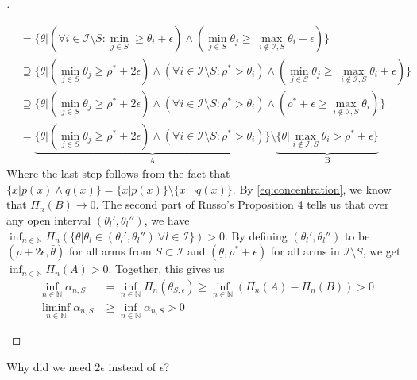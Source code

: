 \begin{proof}[]
\begin{itemize}
\begin{align}
    &= \{\theta | (\forall i \in \mathcal{I} \setminus S: \min_{j \in S} \geq \theta_i + \epsilon) \wedge (\min_{j \in S} \theta_j \geq\ \max_{i \notin \mathcal{I}, S} \theta_i + \epsilon)\} \\
    &\supseteq \{\theta |(\min_{j \in S} \theta_j \geq \rho^* + 2 \epsilon) \wedge (\forall i \in \mathcal{I} \setminus S: \rho^* > \theta_i) \wedge (\min_{j \in S} \theta_j \geq\ \max_{i \notin \mathcal{I}, S} \theta_i + \epsilon)\} \\
    &\supseteq \{\theta |(\min_{j \in S} \theta_j \geq \rho^* + 2 \epsilon) \wedge (\forall i \in \mathcal{I} \setminus S: \rho^* > \theta_i) \wedge (\rho^* + \epsilon \geq \max_{i \notin \mathcal{I}, S} \theta_i)\} \\
    &=  \underbrace{\{\theta |(\min_{j \in S} \theta_j \geq \rho^* + 2 \epsilon) \wedge (\forall i \in \mathcal{I} \setminus S: \rho^* > \theta_i) \}}_\text{A} \setminus \underbrace{\{\theta| \max_{i \notin \mathcal{I}, S} \theta_i > \rho^* + \epsilon\}}_\text{B}
  \end{align}
  Where the last step follows from the fact that $\{x|p(x) \wedge q(x)\} = \{x|p(x)\} \setminus \{x|\neg q(x)\}$.
  By \eqref{eq:concentration}, we know that $\Pi_n(B) \rightarrow 0$. The second part of Russo's Proposition 4 tells us that over any open interval $(\theta_l', \theta_l'')$, we have $\inf_{n \in \mathbb{N}} \Pi_n(\{\theta| \theta_l \in (\theta_l', \theta_l'')\ \forall l \in \mathcal{I}\}) > 0$. By defining $(\theta_l', \theta_l'')$ to be $(\rho + 2 \epsilon, \bar{\theta})$ for all arms from $S \subset \mathcal{I}$ and $(\underline{\theta}, \rho^* + \epsilon)$ for all arms in $\mathcal{I} \setminus S$, we get $\inf_{n \in \mathbb{N}} \Pi_n(A) > 0$.
  Together, this gives us
  \begin{align}
    \inf_{n \in \mathbb{N}} \alpha_{n, S} &= \inf_{n \in \mathbb{N}} \Pi_n(\theta_{S, \epsilon}) \geq \inf_{n \in \mathbb{N}}(\Pi_n(A) - \Pi_n(B)) > 0 \\
    \liminf_{n \in \mathbb{N}} \alpha_{n, S} &\geq \inf_{n \in \mathbb{N}} \alpha_{n, S} > 0
  \end{align}
  \end{itemize}
\end{proof}

\begin{remark}[Kevin 19/09/05]
  Why did we need $2\epsilon$ instead of $\epsilon$?
\end{remark}

